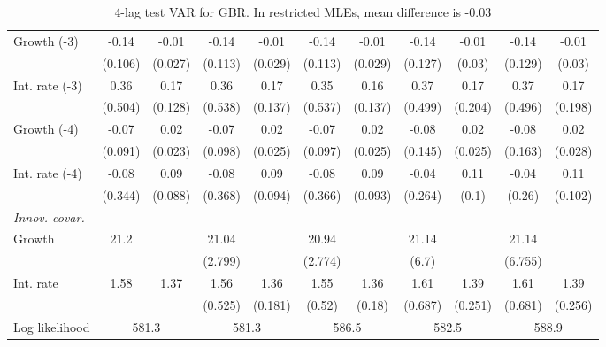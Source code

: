 \begin{table}[htbp]
\begin{tabular}{@{\extracolsep{4pt}}lcccccccccc@{}}
\quad Growth (-3) 	 &-0.14 	 & -0.01 	 & -0.14 	 & -0.01 	 & -0.14 	 & -0.01 	 & -0.14 	 & -0.01 	 & -0.14 	 & -0.01	 \\ 
 		 & (0.106) 	 & (0.027) 	 & (0.113) 	 & (0.029) 	 & (0.113) 	 & (0.029) 	 & (0.127) 	 & (0.03) 	 & (0.129) 	 & (0.03) 	 \\ 
\quad Int. rate (-3) 	 &0.36 	 & 0.17 	 & 0.36 	 & 0.17 	 & 0.35 	 & 0.16 	 & 0.37 	 & 0.17 	 & 0.37 	 & 0.17	 \\ 
 		 & (0.504) 	 & (0.128) 	 & (0.538) 	 & (0.137) 	 & (0.537) 	 & (0.137) 	 & (0.499) 	 & (0.204) 	 & (0.496) 	 & (0.198) 	 \\ 
\quad Growth (-4) 	 &-0.07 	 & 0.02 	 & -0.07 	 & 0.02 	 & -0.07 	 & 0.02 	 & -0.08 	 & 0.02 	 & -0.08 	 & 0.02	 \\ 
 		 & (0.091) 	 & (0.023) 	 & (0.098) 	 & (0.025) 	 & (0.097) 	 & (0.025) 	 & (0.145) 	 & (0.025) 	 & (0.163) 	 & (0.028) 	 \\ 
\quad Int. rate (-4) 	 &-0.08 	 & 0.09 	 & -0.08 	 & 0.09 	 & -0.08 	 & 0.09 	 & -0.04 	 & 0.11 	 & -0.04 	 & 0.11	 \\ 
 		 & (0.344) 	 & (0.088) 	 & (0.368) 	 & (0.094) 	 & (0.366) 	 & (0.093) 	 & (0.264) 	 & (0.1) 	 & (0.26) 	 & (0.102) 	 \\ 
\rule{0pt}{4ex} \emph{Innov. covar.}  	 & 	 & 	 & 	 & 	 & 	 & 	 & 	 & 	 & 	 &\\ 
\quad Growth 	 &21.2 	 &  	 & 21.04 	 &  	 & 20.94 	 &  	 & 21.14 	 &  	 & 21.14 	 & 	 \\ 
 		 &  	 &  	 & (2.799) 	 &  	 & (2.774) 	 &  	 & (6.7) 	 &  	 & (6.755) 	 &  	 \\ 
\quad Int. rate 	 &1.58 	 & 1.37 	 & 1.56 	 & 1.36 	 & 1.55 	 & 1.36 	 & 1.61 	 & 1.39 	 & 1.61 	 & 1.39	 \\ 
 		 &  	 &  	 & (0.525) 	 & (0.181) 	 & (0.52) 	 & (0.18) 	 & (0.687) 	 & (0.251) 	 & (0.681) 	 & (0.256) 	 \\ 
 \hline \rule{0pt}{4ex} 
  Log likelihood 	 &\multicolumn{2}{c}{581.3} 	 & \multicolumn{2}{c}{581.3} 	 & \multicolumn{2}{c}{586.5} 	 & \multicolumn{2}{c}{582.5} 	 & \multicolumn{2}{c}{588.9}\\ 

 \hline 	\end{tabular}		\caption{4-lag test VAR for GBR. In restricted MLEs, mean difference is -0.03}
		\label{tab:GBR4}

\end{table}